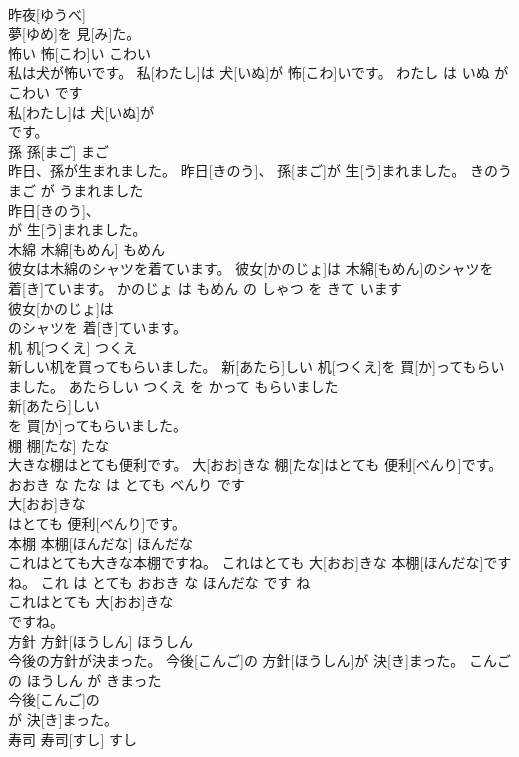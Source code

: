 \documentclass[8pt]{extreport}
\begin{document}
\begin{CJK}{UTF8}{min}
\\	昨夜[ゆうべ]
\\	夢[ゆめ]を 見[み]た。			
\\	怖い	怖[こわ]い	こわい	
\\	私は犬が怖いです。	私[わたし]は 犬[いぬ]が 怖[こわ]いです。	わたし は いぬ が こわい です	
\\	私[わたし]は 犬[いぬ]が
\\	です。			
\\	孫	孫[まご]	まご	
\\	昨日、孫が生まれました。	昨日[きのう]、 孫[まご]が 生[う]まれました。	きのう まご が うまれました	
\\	昨日[きのう]、
\\	が 生[う]まれました。			
\\	木綿	木綿[もめん]	もめん	
\\	彼女は木綿のシャツを着ています。	彼女[かのじょ]は 木綿[もめん]のシャツを 着[き]ています。	かのじょ は もめん の しゃつ を きて います	
\\	彼女[かのじょ]は
\\	のシャツを 着[き]ています。			
\\	机	机[つくえ]	つくえ	
\\	新しい机を買ってもらいました。	新[あたら]しい 机[つくえ]を 買[か]ってもらいました。	あたらしい つくえ を かって もらいました	
\\	新[あたら]しい
\\	を 買[か]ってもらいました。			
\\	棚	棚[たな]	たな	
\\	大きな棚はとても便利です。	大[おお]きな 棚[たな]はとても 便利[べんり]です。	おおき な たな は とても べんり です	
\\	大[おお]きな
\\	はとても 便利[べんり]です。			
\\	本棚	本棚[ほんだな]	ほんだな	
\\	これはとても大きな本棚ですね。	これはとても 大[おお]きな 本棚[ほんだな]ですね。	これ は とても おおき な ほんだな です ね	
\\	これはとても 大[おお]きな
\\	ですね。			
\\	方針	方針[ほうしん]	ほうしん	
\\	今後の方針が決まった。	今後[こんご]の 方針[ほうしん]が 決[き]まった。	こんご の ほうしん が きまった	
\\	今後[こんご]の
\\	が 決[き]まった。			
\\	寿司	寿司[すし]	すし	

\end{CJK}
\end{document}
